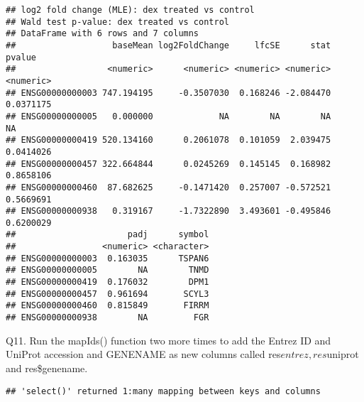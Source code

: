 \documentclass[
]{article}
\newenvironment{Shaded}{\begin{snugshade}}{\end{snugshade}}
\newcommand{\AttributeTok}[1]{\textcolor[rgb]{0.13,0.29,0.53}{#1}}
\newcommand{\FunctionTok}[1]{\textcolor[rgb]{0.13,0.29,0.53}{\textbf{#1}}}
\newcommand{\NormalTok}[1]{#1}
\newcommand{\OtherTok}[1]{\textcolor[rgb]{0.56,0.35,0.01}{#1}}
\newcommand{\SpecialCharTok}[1]{\textcolor[rgb]{0.81,0.36,0.00}{\textbf{#1}}}
\newcommand{\StringTok}[1]{\textcolor[rgb]{0.31,0.60,0.02}{#1}}
\begin{document}
\begin{verbatim}
## log2 fold change (MLE): dex treated vs control 
## Wald test p-value: dex treated vs control 
## DataFrame with 6 rows and 7 columns
##                   baseMean log2FoldChange     lfcSE      stat    pvalue
##                  <numeric>      <numeric> <numeric> <numeric> <numeric>
## ENSG00000000003 747.194195     -0.3507030  0.168246 -2.084470 0.0371175
## ENSG00000000005   0.000000             NA        NA        NA        NA
## ENSG00000000419 520.134160      0.2061078  0.101059  2.039475 0.0414026
## ENSG00000000457 322.664844      0.0245269  0.145145  0.168982 0.8658106
## ENSG00000000460  87.682625     -0.1471420  0.257007 -0.572521 0.5669691
## ENSG00000000938   0.319167     -1.7322890  3.493601 -0.495846 0.6200029
##                      padj      symbol
##                 <numeric> <character>
## ENSG00000000003  0.163035      TSPAN6
## ENSG00000000005        NA        TNMD
## ENSG00000000419  0.176032        DPM1
## ENSG00000000457  0.961694       SCYL3
## ENSG00000000460  0.815849       FIRRM
## ENSG00000000938        NA         FGR
\end{verbatim}

Q11. Run the mapIds() function two more times to add the Entrez ID and
UniProt accession and GENENAME as new columns called
res\(entrez, res\)uniprot and res\$genename.

\begin{Shaded}
\end{Shaded}

\begin{verbatim}
## 'select()' returned 1:many mapping between keys and columns
\end{verbatim}

\begin{Shaded}
\end{Shaded}
\end{document}
